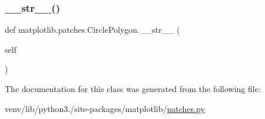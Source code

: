 \subsubsection{\texorpdfstring{\+\_\+\+\_\+str\+\_\+\+\_\+()}{\_\_str\_\_()}}
{\footnotesize\ttfamily def matplotlib.\+patches.\+Circle\+Polygon.\+\_\+\+\_\+str\+\_\+\+\_\+ (\begin{DoxyParamCaption}\item[{}]{self }\end{DoxyParamCaption})}



The documentation for this class was generated from the following file\+:\begin{DoxyCompactItemize}
\item 
venv/lib/python3./site-\/packages/matplotlib/\hyperlink{patches_8py}{patches.\+py}\end{DoxyCompactItemize}
